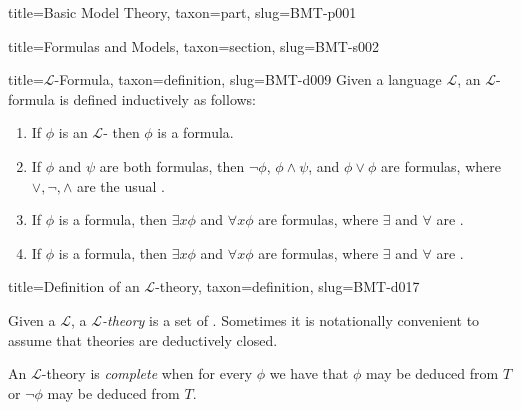 \documentclass[a4paper]{article}
\begin{document}
\begin{tree}{title={Basic Model Theory}, taxon={part}, slug={BMT-p001}}
\begin{tree}{title={Formulas and Models}, taxon={section}, slug={BMT-s002}}
\begin{tree}{title={\(\mathcal {L}\)-Formula}, taxon={definition}, slug={BMT-d009}}
Given a language \(\mathcal {L}\), an \(\mathcal {L}\)-formula is defined inductively as follows:\par{\begin{enumerate}
\item{
            If \(\phi\) is an \(\mathcal {L}\)- then \(\phi\) is a formula.
        }
        \item{
            If \(\phi\) and \(\psi\) are both formulas, then \(\neg \phi\), \(\phi   \land   \psi\), and 
            \(\phi \lor \phi\) are formulas, where \(\lor , \neg , \land\) are the usual .
        }
        \item{
            If \(\phi\) is a formula, then \(\exists  x  \phi\) and \(\forall  x  \phi\) are formulas, 
            where \(\exists\) and \(\forall\) are .
        }
        \item{
            If \(\phi\) is a formula, then \(\exists  x  \phi\) and \(\forall  x  \phi\) are formulas, 
            where \(\exists\) and \(\forall\) are .
        }
\end{enumerate}}
\end{tree}

\begin{tree}{title={Definition of an \(\mathcal {L}\)-theory}, taxon={definition}, slug={BMT-d017}}

    Given a  \(\mathcal {L}\), a \emph{\(\mathcal {L}\)-theory} is a set of .
    Sometimes it is notationally convenient to assume that theories are deductively closed.
\par{
    An \(\mathcal  L\)-theory is \emph{complete} when for every  \(\phi\) we have that
    \(\phi\) may be deduced from \(T\) or \(\neg \phi\) may be deduced from \(T\).
}
\end{tree}

\end{tree}


  
  

\end{tree}
\end{document}
